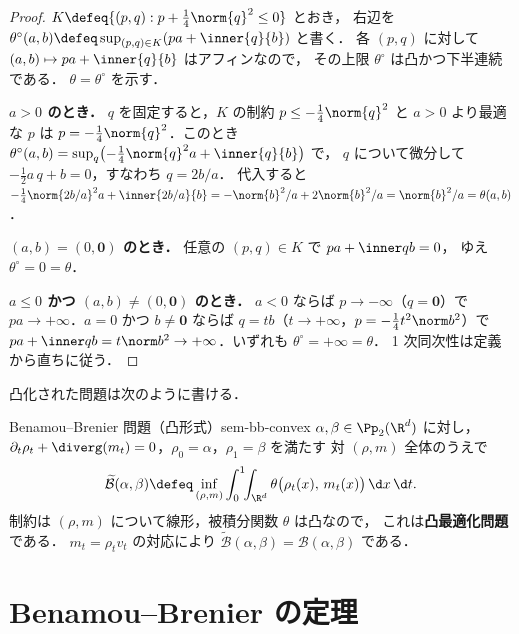 \begin{proof}
  $K\defeq\{(p,q): p+\tfrac14\norm{q}^2\le 0\}$ とおき，
  右辺を $\theta^\circ(a,b)\defeq\sup_{(p,q)\in K}(pa+\inner{q}{b})$ と書く．
  各 $(p,q)$ に対して $(a,b)\mapsto pa+\inner{q}{b}$ はアフィンなので，
  その上限 $\theta^\circ$ は凸かつ下半連続である．
  $\theta=\theta^\circ$ を示す．

  \textbf{$a>0$ のとき．} $q$ を固定すると，$K$ の制約 $p\le-\tfrac14\norm{q}^2$ と
  $a>0$ より最適な $p$ は $p=-\tfrac14\norm{q}^2$．このとき
  $\theta^\circ(a,b)=\sup_q\bigl(-\tfrac14\norm{q}^2 a+\inner{q}{b}\bigr)$ で，
  $q$ について微分して $-\tfrac12 a\,q+b=0$，すなわち $q=2b/a$．
  代入すると $-\tfrac14\norm{2b/a}^2 a+\inner{2b/a}{b}
  =-\norm{b}^2/a+2\norm{b}^2/a=\norm{b}^2/a=\theta(a,b)$．

  \textbf{$(a,b)=(0,\mathbf 0)$ のとき．} 任意の $(p,q)\in K$ で $pa+\inner qb=0$，
  ゆえ $\theta^\circ=0=\theta$．

  \textbf{$a\le0$ かつ $(a,b)\neq(0,\mathbf0)$ のとき．} $a<0$ ならば
  $p\to-\infty$（$q=\mathbf0$）で $pa\to+\infty$．$a=0$ かつ $b\neq\mathbf0$ ならば
  $q=tb$（$t\to+\infty$，$p=-\tfrac14 t^2\norm b^2$）で
  $pa+\inner qb=t\norm b^2\to+\infty$．いずれも $\theta^\circ=+\infty=\theta$．
  1 次同次性は定義から直ちに従う．
\end{proof}

凸化された問題は次のように書ける．

\begin{definition}{Benamou--Brenier 問題（凸形式）}{sem-bb-convex}
  $\alpha,\beta\in\Pp_2(\R^d)$ に対し，
  $\partial_t\rho_t+\diverg(m_t)=0$，$\rho_0=\alpha$，$\rho_1=\beta$ を満たす
  対 $(\rho,m)$ 全体のうえで
  \[
    \widetilde{\mathcal{B}}(\alpha,\beta)
    \defeq
    \inf_{(\rho,m)}
    \int_0^1\!\!\int_{\R^d} \theta\bigl(\rho_t(x),\,m_t(x)\bigr)\,\d x\,\d t .
  \]
  制約は $(\rho,m)$ について線形，被積分関数 $\theta$ は凸なので，
  これは\textbf{凸最適化問題}である．
  $m_t=\rho_t v_t$ の対応により
  $\widetilde{\mathcal{B}}(\alpha,\beta)=\mathcal{B}(\alpha,\beta)$ である．
\end{definition}

\section{Benamou--Brenier の定理}
\label{sec:sem-bb-theorem}

